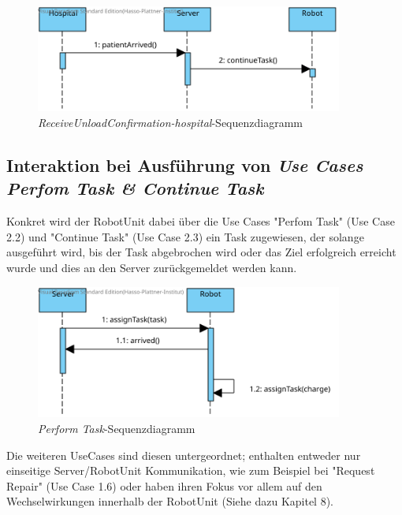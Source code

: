 \begin{figure}[H]
	\centering
	\includegraphics[width=0.9\textwidth]{img/2-Entwurf-ReceiveUnloadConfirmation-hospital}
	\caption{\emph{ReceiveUnloadConfirmation-hospital}-Sequenzdiagramm}
	\label{SequenzDiagrammInteraktion}
\end{figure}


\subsection*{Interaktion bei Ausführung von \emph{Use Cases Perfom Task \& Continue Task}}
Konkret wird der RobotUnit dabei über die Use Cases "Perfom Task" (Use Case 2.2) und "Continue Task" (Use Case 2.3) ein Task zugewiesen, der solange ausgeführt wird, bis der Task abgebrochen wird oder das Ziel erfolgreich erreicht wurde und dies an den Server zurückgemeldet werden kann. \\

\begin{figure}[H]
	\centering
	\includegraphics[width=0.9\textwidth]{img/2-Entwurf-PerformTask}
	\caption{\emph{Perform Task}-Sequenzdiagramm}
	\label{SequenzDiagrammInteraktion}
\end{figure}

Die weiteren UseCases sind diesen untergeordnet; enthalten entweder nur einseitige Server/RobotUnit Kommunikation, wie zum Beispiel bei "Request Repair" (Use Case 1.6) oder haben ihren Fokus vor allem auf den Wechselwirkungen innerhalb der RobotUnit (Siehe dazu Kapitel 8). \\

